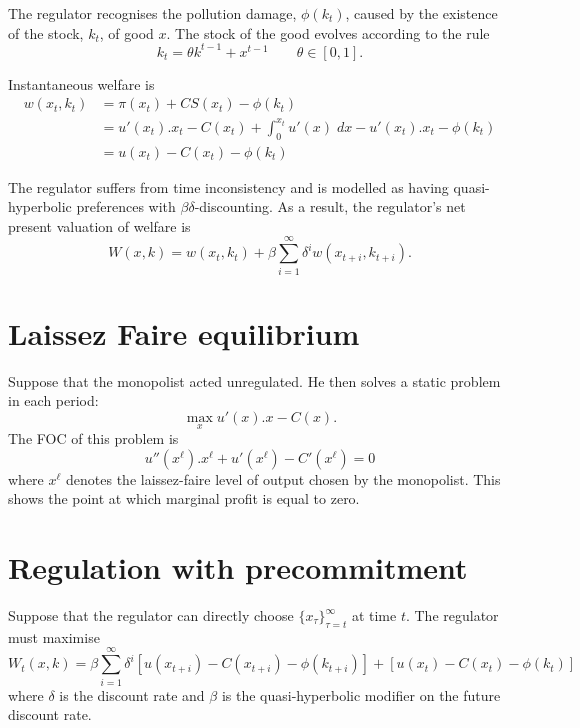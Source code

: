 \documentclass{amsart}
\begin{document}
The regulator recognises the pollution damage, $\phi(k_t)$, caused by
the existence of the stock, $k_t$, of good $x$. The stock of the good
evolves according to the rule
\begin{equation}
  \label{eq:6} k_t = \theta k^{t-1} + x^{t-1} \qquad \theta \in [0,1].
\end{equation}

Instantaneous welfare is
\begin{align}
  \label{eq:7}
  w(x_t,k_t) &= \pi(x_t) + CS(x_t) - \phi(k_t) \\
  &=  u'(x_t).x_t - C(x_t) + \int_0^{x_t} u'(x)\; dx - u'(x_t).x_t - \phi(k_t) \\
  &= u(x_t) - C(x_t) - \phi(k_t)
\end{align}

The regulator suffers from time inconsistency and is modelled as
having quasi-hyperbolic preferences with $\beta\delta$-discounting. As
a result, the regulator's net present valuation of welfare is
\begin{equation}
  \label{eq:8}
  W(x,k) = w(x_t,k_t) + \beta \sum_{i=1}^\infty \delta^i w(x_{t+i},k_{t+i}).
\end{equation}

\section{Laissez Faire equilibrium}
\label{sec:laiss-faire-equil}

Suppose that the monopolist acted unregulated. He then solves a static
problem in each period:
\begin{equation}
  \label{eq:9}
  \max_x u'(x).x - C(x).
\end{equation}
The FOC of this problem is
\begin{equation}
  \label{eq:10}
  u''\left( x^{\ell}\right) .x^{\ell} + u'\left( x^{\ell}\right)  - C'\left( x^{\ell}\right)  = 0
\end{equation}
where $x^{\ell}$ denotes the laissez-faire level of output chosen by the
monopolist. This shows the point at which marginal profit is equal to
zero.


\section{Regulation with precommitment}
\label{sec:regul-with-prec}

Suppose that the regulator can directly choose $\{ x_\tau
\}_{\tau=t}^\infty$ at time $t$. The regulator must maximise
\begin{equation}
  \label{eq:11}
  W_t(x,k) = \beta \sum_{i=1}^\infty \delta^i \left[ u(x_{t+i}) -
    C(x_{t+i}) - \phi(k_{t+i}) \right] + \left[ u(x_t) -
    C(x_t)  - \phi(k_t) \right]
\end{equation}
where $\delta$ is the discount rate and $\beta$ is the
quasi-hyperbolic modifier on the future discount rate.
\end{document}
